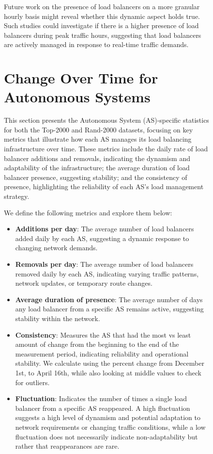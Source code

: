 \documentclass[12pt]{cwru_thesis}
\begin{document}
\begin{figure}[h!]
Future work on the presence of load balancers on a more granular hourly basis might reveal whether this dynamic aspect holds true. Such studies could investigate if there is a higher presence of load balancers during peak traffic hours, suggesting that load balancers are actively managed in response to real-time traffic demands.


\section{Change Over Time for Autonomous Systems}

This section presents the Autonomous System (AS)-specific statistics for both the Top-2000 and Rand-2000 datasets, focusing on key metrics that illustrate how each AS manages its load balancing infrastructure over time. These metrics include the daily rate of load balancer additions and removals, indicating the dynamism and adaptability of the infrastructure; the average duration of load balancer presence, suggesting stability; and the consistency of presence, highlighting the reliability of each AS's load management strategy.

We define the following metrics and explore them below:
\begin{itemize}
    \item \textbf{Additions per day}: The average number of load balancers added daily by each AS, suggesting a dynamic response to changing network demands.
    \item \textbf{Removals per day}: The average number of load balancers removed daily by each AS, indicating varying traffic patterns, network updates, or temporary route changes.
    \item \textbf{Average duration of presence}: The average number of days any load balancer from a specific AS remains active, suggesting stability within the network.
    \item \textbf{Consistency}: Measures the AS that had the most vs least amount of change from the beginning to the end of the measurement period, indicating reliability and operational stability. We calculate using the percent change from December 1st, to April 16th, while also looking at middle values to check for outliers. 
    
    \item \textbf{Fluctuation}: Indicates the number of times a single load balancer from a specific AS reappeared. A high fluctuation suggests a high level of dynamism and potential adaptation to network requirements or changing traffic conditions, while a low fluctuation does not necessarily indicate non-adaptability but rather that reappearances are rare.
\end{itemize}



\end{figure}
\end{document}
